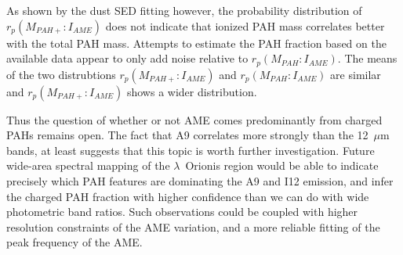       As shown by the dust SED fitting however, the probability distribution of $r_{p}(M_{PAH+}:I_{AME})$ does not indicate that ionized PAH mass correlates better with the total PAH mass. Attempts to estimate the PAH fraction based on the available data appear to only add noise relative to $r_{p}(M_{PAH}:I_{AME})$. The means of the two distrubtions $r_{p}(M_{PAH+}:I_{AME})$  and $r_{p}(M_{PAH}:I_{AME})$ are similar and $r_{p}(M_{PAH+}:I_{AME})$ shows a wider distribution.

     Thus the question of whether or not AME comes predominantly from charged PAHs remains open. The fact that A9 correlates more strongly than the 12~$\mu$m bands, at least suggests that this topic is worth further investigation. Future wide-area spectral mapping of the $\lambda$~Orionis region would be able to indicate precisely which PAH features are dominating the A9 and I12 emission, and infer the charged PAH fraction with higher confidence than we can do with wide photometric band ratios. Such observations could be coupled with higher resolution constraints of the AME variation, and a more reliable fitting of the peak frequency of the AME.
